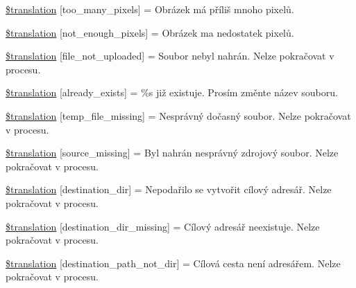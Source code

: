 \begin{DoxyCompactItemize}
\item 
\hyperlink{class_8upload_8cs___c_s_8php_aa4051ef64e94a3f8295c63cf85544016}{\$translation} \mbox{[}\textquotesingle{}too\+\_\+many\+\_\+pixels\textquotesingle{}\mbox{]} = \textquotesingle{}Obrázek má příliš mnoho pixelů.\textquotesingle{}
\item 
\hyperlink{class_8upload_8cs___c_s_8php_a1fe342c27ce61f4ff4e0120ba647033e}{\$translation} \mbox{[}\textquotesingle{}not\+\_\+enough\+\_\+pixels\textquotesingle{}\mbox{]} = \textquotesingle{}Obrázek ma nedostatek pixelů.\textquotesingle{}
\item 
\hyperlink{class_8upload_8cs___c_s_8php_a4ce76e7be0b3a03c2b47f6d70c21832e}{\$translation} \mbox{[}\textquotesingle{}file\+\_\+not\+\_\+uploaded\textquotesingle{}\mbox{]} = \textquotesingle{}Soubor nebyl nahrán. Nelze pokračovat v procesu.\textquotesingle{}
\item 
\hyperlink{class_8upload_8cs___c_s_8php_afd84e910217f04139f567c41e292afa5}{\$translation} \mbox{[}\textquotesingle{}already\+\_\+exists\textquotesingle{}\mbox{]} = \textquotesingle{}\%s již existuje. Prosím změnte název souboru.\textquotesingle{}
\item 
\hyperlink{class_8upload_8cs___c_s_8php_ab0fa87a88aba2624004581eed0633325}{\$translation} \mbox{[}\textquotesingle{}temp\+\_\+file\+\_\+missing\textquotesingle{}\mbox{]} = \textquotesingle{}Nesprávný dočasný soubor. Nelze pokračovat v procesu.\textquotesingle{}
\item 
\hyperlink{class_8upload_8cs___c_s_8php_aceaaf7355acaaf10f0ae60378d03c468}{\$translation} \mbox{[}\textquotesingle{}source\+\_\+missing\textquotesingle{}\mbox{]} = \textquotesingle{}Byl nahrán nesprávný zdrojový soubor. Nelze pokračovat v procesu.\textquotesingle{}
\item 
\hyperlink{class_8upload_8cs___c_s_8php_aff2427c72a2598aefa6d58df1dd18b08}{\$translation} \mbox{[}\textquotesingle{}destination\+\_\+dir\textquotesingle{}\mbox{]} = \textquotesingle{}Nepodařilo se vytvořit cílový adresář. Nelze pokračovat v procesu.\textquotesingle{}
\item 
\hyperlink{class_8upload_8cs___c_s_8php_a9ef28d3cf09942c6c0a1e77fa09185e8}{\$translation} \mbox{[}\textquotesingle{}destination\+\_\+dir\+\_\+missing\textquotesingle{}\mbox{]} = \textquotesingle{}Cílový adresář neexistuje. Nelze pokračovat v procesu.\textquotesingle{}
\item 
\hyperlink{class_8upload_8cs___c_s_8php_a5704a67137126e8c87b7a364175929d4}{\$translation} \mbox{[}\textquotesingle{}destination\+\_\+path\+\_\+not\+\_\+dir\textquotesingle{}\mbox{]} = \textquotesingle{}Cílová cesta není adresářem. Nelze pokračovat v procesu.\textquotesingle{}

\end{DoxyCompactItemize}
